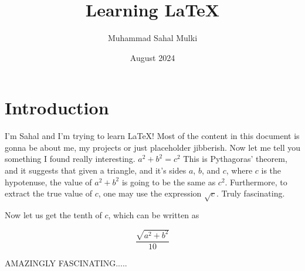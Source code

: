 \documentclass{article}
\title{Learning LaTeX}
\author{Muhammad Sahal Mulki}
\date{August 2024}
\begin{document}
\maketitle

\section{Introduction}

I'm Sahal and I'm trying to learn \LaTeX! Most of the content in this document is gonna be about me, my projects or just placeholder jibberish. Now let me tell you something I found really interesting. $a^2 + b^2 = c^2$ This is Pythagoras' theorem, and it suggests that given a triangle, and it's sides $a$, $b$, and $c$, where $c$ is the hypotenuse, the value of $a^2 + b^2$ is going to be the same as $c^2$. Furthermore, to extract the true value of $c$, one may use the expression $\sqrt{c}$. Truly fascinating.

\bigskip

Now let us get the tenth of $c$, which can be written as

$$\frac{\sqrt{a^2 + b^2}}{10}$$

\bigskip

AMAZINGLY FASCINATING.....

\bigskip

\lipsum[1]
\end{document}
